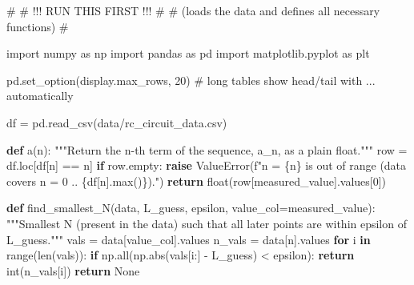 \documentclass[
  letterpaper,
  DIV=11,
  numbers=noendperiod]{scrreprt}
\newenvironment{Shaded}{\begin{snugshade}}{\end{snugshade}}
\newcommand{\BuiltInTok}[1]{\textcolor[rgb]{0.00,0.23,0.31}{#1}}
\newcommand{\CommentTok}[1]{\textcolor[rgb]{0.37,0.37,0.37}{#1}}
\newcommand{\ControlFlowTok}[1]{\textcolor[rgb]{0.00,0.23,0.31}{\textbf{#1}}}
\newcommand{\DecValTok}[1]{\textcolor[rgb]{0.68,0.00,0.00}{#1}}
\newcommand{\ImportTok}[1]{\textcolor[rgb]{0.00,0.46,0.62}{#1}}
\newcommand{\KeywordTok}[1]{\textcolor[rgb]{0.00,0.23,0.31}{\textbf{#1}}}
\newcommand{\NormalTok}[1]{\textcolor[rgb]{0.00,0.23,0.31}{#1}}
\newcommand{\OperatorTok}[1]{\textcolor[rgb]{0.37,0.37,0.37}{#1}}
\newcommand{\PreprocessorTok}[1]{\textcolor[rgb]{0.68,0.00,0.00}{#1}}
\newcommand{\SpecialCharTok}[1]{\textcolor[rgb]{0.37,0.37,0.37}{#1}}
\newcommand{\SpecialStringTok}[1]{\textcolor[rgb]{0.13,0.47,0.30}{#1}}
\newcommand{\StringTok}[1]{\textcolor[rgb]{0.13,0.47,0.30}{#1}}
\newcommand{\VariableTok}[1]{\textcolor[rgb]{0.07,0.07,0.07}{#1}}
\theoremstyle{plain}
\theoremstyle{plain}
\theoremstyle{definition}
\theoremstyle{definition}
\theoremstyle{definition}
\theoremstyle{plain}
\theoremstyle{plain}
\theoremstyle{remark}
\begin{document}
\begin{Shaded}
\begin{Highlighting}[]
\CommentTok{\#}
\CommentTok{\# !!! RUN THIS FIRST !!!}
\CommentTok{\#}
\CommentTok{\# (loads the data and defines all necessary functions)}
\CommentTok{\#}


\ImportTok{import}\NormalTok{ numpy }\ImportTok{as}\NormalTok{ np}
\ImportTok{import}\NormalTok{ pandas }\ImportTok{as}\NormalTok{ pd}
\ImportTok{import}\NormalTok{ matplotlib.pyplot }\ImportTok{as}\NormalTok{ plt}

\NormalTok{pd.set\_option(}\StringTok{\textquotesingle{}display.max\_rows\textquotesingle{}}\NormalTok{, }\DecValTok{20}\NormalTok{)  }\CommentTok{\# long tables show head/tail with \textquotesingle{}...\textquotesingle{} automatically}

\NormalTok{df }\OperatorTok{=}\NormalTok{ pd.read\_csv(}\StringTok{\textquotesingle{}data/rc\_circuit\_data.csv\textquotesingle{}}\NormalTok{)}

\KeywordTok{def}\NormalTok{ a(n):}
    \CommentTok{"""Return the n{-}th term of the sequence, a\_n, as a plain float."""}
\NormalTok{    row }\OperatorTok{=}\NormalTok{ df.loc[df[}\StringTok{\textquotesingle{}n\textquotesingle{}}\NormalTok{] }\OperatorTok{==}\NormalTok{ n]}
    \ControlFlowTok{if}\NormalTok{ row.empty:}
        \ControlFlowTok{raise} \PreprocessorTok{ValueError}\NormalTok{(}\SpecialStringTok{f"n = }\SpecialCharTok{\{}\NormalTok{n}\SpecialCharTok{\}}\SpecialStringTok{ is out of range (data covers n = 0 .. }\SpecialCharTok{\{}\NormalTok{df[}\StringTok{\textquotesingle{}n\textquotesingle{}}\NormalTok{]}\SpecialCharTok{.}\BuiltInTok{max}\NormalTok{()}\SpecialCharTok{\}}\SpecialStringTok{)."}\NormalTok{)}
    \ControlFlowTok{return} \BuiltInTok{float}\NormalTok{(row[}\StringTok{\textquotesingle{}measured\_value\textquotesingle{}}\NormalTok{].values[}\DecValTok{0}\NormalTok{])}

\KeywordTok{def}\NormalTok{ find\_smallest\_N(data, L\_guess, epsilon, value\_col}\OperatorTok{=}\StringTok{\textquotesingle{}measured\_value\textquotesingle{}}\NormalTok{):}
    \CommentTok{"""Smallest N (present in the data) such that all later points are within epsilon of L\_guess."""}
\NormalTok{    vals }\OperatorTok{=}\NormalTok{ data[value\_col].values}
\NormalTok{    n\_vals }\OperatorTok{=}\NormalTok{ data[}\StringTok{\textquotesingle{}n\textquotesingle{}}\NormalTok{].values}
    \ControlFlowTok{for}\NormalTok{ i }\KeywordTok{in} \BuiltInTok{range}\NormalTok{(}\BuiltInTok{len}\NormalTok{(vals)):}
        \ControlFlowTok{if}\NormalTok{ np.}\BuiltInTok{all}\NormalTok{(np.}\BuiltInTok{abs}\NormalTok{(vals[i:] }\OperatorTok{{-}}\NormalTok{ L\_guess) }\OperatorTok{\textless{}}\NormalTok{ epsilon):}
            \ControlFlowTok{return} \BuiltInTok{int}\NormalTok{(n\_vals[i])}
    \ControlFlowTok{return} \VariableTok{None}



\end{Highlighting}
\end{Shaded}
\end{document}
